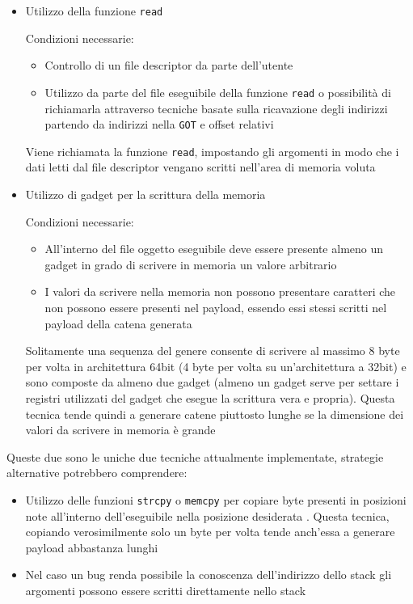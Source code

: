 \begin{itemize}

\item  Utilizzo della funzione \lstinline{read}

  Condizioni necessarie: 
  \begin{itemize}
   \item Controllo di un file descriptor da parte dell'utente
   \item Utilizzo da parte del file eseguibile della funzione
     \lstinline{read} o possibilità di richiamarla attraverso tecniche
     basate sulla ricavazione degli indirizzi partendo da indirizzi
     nella \lstinline{GOT} e offset relativi
  \end{itemize}

  Viene richiamata la funzione \lstinline{read}, impostando gli
  argomenti in modo che i dati letti dal file descriptor vengano
  scritti nell'area di memoria voluta

\item Utilizzo di gadget per la scrittura della memoria

  Condizioni necessarie:
  \begin{itemize}

    \item All'interno del file oggetto eseguibile deve essere presente
      almeno un gadget in grado di scrivere in memoria un valore
      arbitrario

    \item I valori da scrivere nella memoria non possono presentare
      caratteri che non possono essere presenti nel payload, essendo
      essi stessi scritti nel payload della catena generata

  \end{itemize}
  Solitamente una sequenza del genere consente di scrivere al massimo
  8 byte per volta in architettura 64bit (4 byte per volta su
  un'architettura a 32bit) e sono composte da almeno due gadget
  (almeno un gadget serve per settare i registri utilizzati del gadget
  che esegue la scrittura vera e propria). Questa tecnica tende quindi
  a generare catene piuttosto lunghe se la dimensione dei valori da
  scrivere in memoria è grande

\end{itemize}

Queste due sono le uniche due tecniche attualmente implementate,
strategie alternative potrebbero comprendere:

\begin{itemize}

\item Utilizzo delle funzioni \lstinline{strcpy} o \lstinline{memcpy}
  per copiare byte presenti in posizioni note all'interno
  dell'eseguibile nella posizione desiderata
  \cite{roglia:2009}. Questa tecnica, copiando verosimilmente solo un
  byte per volta tende anch'essa a generare payload abbastanza lunghi

\item Nel caso un bug renda possibile la conoscenza dell'indirizzo
  dello stack gli argomenti possono essere scritti direttamente nello
  stack

\end{itemize}

